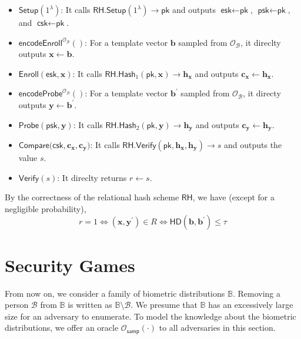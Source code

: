\begin{itemize}

	\item $\textsf{Setup}(1^\lambda)$: It calls $\textsf{RH.Setup}(1^\lambda) \to \textsf{pk}$ and outputs $\textsf{esk} \gets \textsf{pk}$, $\textsf{psk} \gets \textsf{pk}$, and $\textsf{csk} \gets \textsf{pk}$.

	\item $\textsf{encodeEnroll}^{\mathcal{O}_{\mathcal{B}}}()$: For a template vector $\mathbf{b}$ sampled from $\mathcal{O}_\mathcal{B}$, it direclty outputs $\mathbf{x} \gets \mathbf{b}$.

	\item $\textsf{Enroll}(\textsf{esk}, \mathbf{x})$: It calls $\textsf{RH.Hash}_1(\textsf{pk}, \mathbf{x}) \to \mathbf{h_x}$ and outputs $\mathbf{c_x} \gets \mathbf{h_x}$.

	\item $\textsf{encodeProbe}^{\mathcal{O}_{\mathcal{B}}}()$: For a template vector $\mathbf{b}^\prime$ sampled from $\mathcal{O}_\mathcal{B}$, it directy outputs $\mathbf{y} \gets \mathbf{b}^\prime$.

	\item $\textsf{Probe}(\textsf{psk}, \mathbf{y})$: It calls $\textsf{RH.Hash}_2(\textsf{pk}, \mathbf{y}) \to \mathbf{h_y}$ and outputs $\mathbf{c_y} \gets \mathbf{h_y}$.

	\item $\textsf{Compare}(\textsf{csk}, \mathbf{c_x}, \mathbf{c_y)}$: It calls $\textsf{RH.Verify}(\textsf{pk}, \mathbf{h_x}, \mathbf{h_y}) \to s$ and outputs the value $s$.

	\item $\textsf{Verify}(s)$: It direclty returns $r \gets s$.

\end{itemize}

By the correctness of the relational hash scheme $\textsf{RH}$, we have (except for a negligible probability),
\[
	r = 1 \Leftrightarrow (\mathbf{x}, \mathbf{y}^\prime) \in R \Leftrightarrow \textsf{HD}(\mathbf{b}, \mathbf{b}^\prime) \leq \tau
\]




\section{Security Games}
\label{sec:security_game}

From now on, we consider a family of biometric distributions $\mathbb{B}$. Removing a person $\mathcal{B}$ from $\mathbb{B}$ is written as $\mathbb{B} \setminus \mathcal{B}$.
We presume that $\mathbb{B}$ has an excessively large size for an adversary to enumerate. To model the knowledge about the biometric distributions, we offer an oracle $\mathcal{O}_\textsf{samp}(\cdot)$ to all adversaries in this section.

